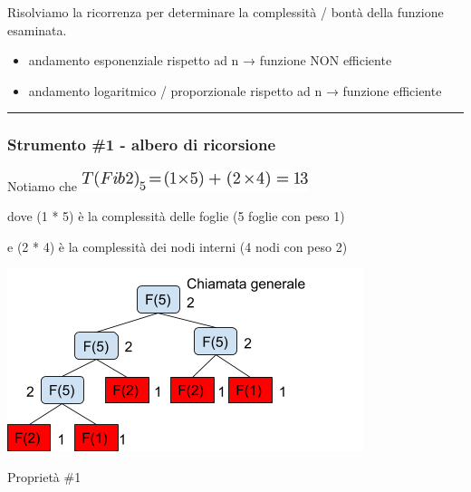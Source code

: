 \documentclass{article}
\providecommand{\tightlist}{%
  \setlength{\itemsep}{0pt}\setlength{\parskip}{0pt}}
\begin{document}
{}

{Risolviamo la ricorrenza per determinare la complessità / bontà della
funzione esaminata.}

\begin{itemize}
\tightlist
\item
  {andamento esponenziale rispetto ad n → funzione NON efficiente}
\item
  {andamento logaritmico / proporzionale rispetto ad n → funzione
  efficiente}
\end{itemize}

{}

{}

{}

{}

\begin{center}\rule{0.5\linewidth}{\linethickness}\end{center}

{}

\hypertarget{h.x4ciu865ga1f}{\subsubsection{\texorpdfstring{{Strumento
\#1 - albero di
ricorsione}}{Strumento \#1 - albero di ricorsione}}\label{h.x4ciu865ga1f}}

{}

{Notiamo che }\includegraphics{images/image33.png}

{dove (1 * 5) è la complessità delle foglie (5 foglie con peso 1)}

{e (2 * 4) è la complessità dei nodi interni (4 nodi con peso 2)}

{}

{\includegraphics{images/image523.png}}

{Proprietà \#1}

{}
\end{document}
